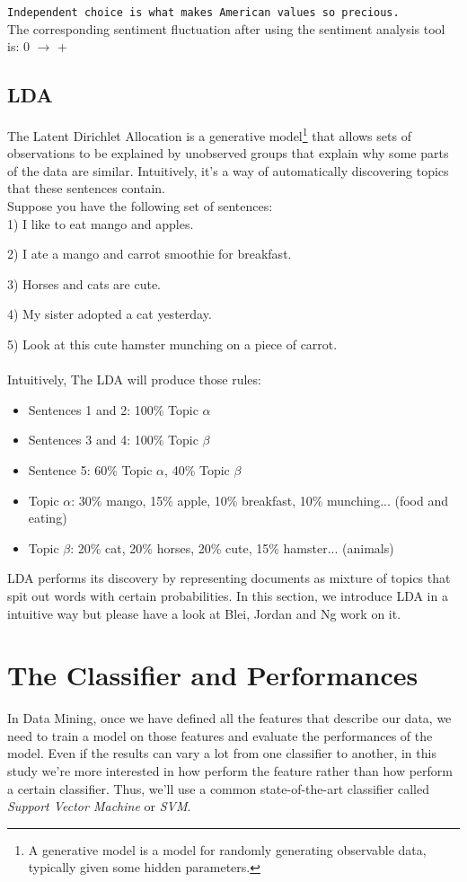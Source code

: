 \texttt{Independent choice is what makes American values so precious.}
\\
The corresponding sentiment fluctuation after using the sentiment analysis tool is: 0 $\rightarrow$ +
\\

\subsection{LDA}
The Latent Dirichlet Allocation is a generative model\footnote{A generative model is a model for randomly generating observable data, typically given some hidden parameters.} that allows sets of observations to be explained by unobserved groups that explain why some parts of the data are similar. Intuitively, it’s a way of automatically discovering topics that these sentences contain. 
\\
Suppose you have the following set of sentences:
\\

1) I like to eat mango and apples.

2) I ate a mango and carrot smoothie for breakfast.

3) Horses and cats are cute.

4) My sister adopted a cat yesterday.

5) Look at this cute hamster munching on a piece of carrot.
\\
\\
Intuitively, The LDA will produce those rules:
\begin{itemize}
  \item Sentences 1 and 2: 100\% Topic $\alpha$
  \item Sentences 3 and 4: 100\% Topic $\beta$
  \item Sentence 5: 60\% Topic $\alpha$, 40\% Topic $\beta$
  \item Topic $\alpha$: 30\% mango, 15\% apple, 10\% breakfast, 10\% munching... (food and eating)
  \item Topic $\beta$: 20\% cat, 20\% horses, 20\% cute, 15\% hamster... (animals)
\end{itemize} 

LDA performs its discovery by representing documents as mixture of topics  that spit out words with certain probabilities. In this section, we introduce LDA in a intuitive way but please have a look at Blei, Jordan and Ng work\cite{Blei:2003:LDA:944919.944937} on it.

\section{The Classifier and Performances}
In Data Mining, once we have defined all the features that describe our data, we need to train a model on those features and evaluate the performances of the model. Even if the results can vary a lot from one classifier to another, in this study we're more interested in how perform the feature rather than how perform a certain classifier. Thus, we'll use a common state-of-the-art classifier called \emph{Support Vector Machine} or \emph{SVM}.

